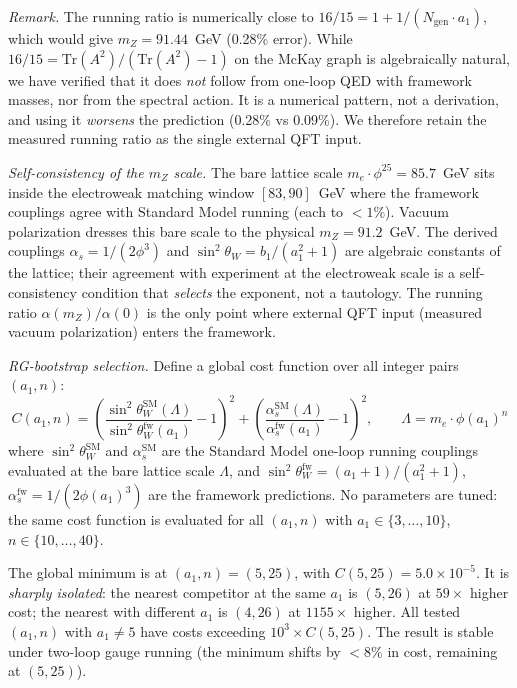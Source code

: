 \documentclass[12pt,a4paper]{article}
\theoremstyle{definition}
\begin{document}
\noindent\textit{Remark.}  The running ratio is numerically close to $16/15 = 1 + 1/(N_{\text{gen}} \cdot a_1)$, which would give $m_Z = 91.44$~GeV (0.28\% error).  While $16/15 = \mathrm{Tr}(A^2)/(\mathrm{Tr}(A^2)-1)$ on the McKay graph is algebraically natural, we have verified that it does \emph{not} follow from one-loop QED with framework masses, nor from the spectral action.  It is a numerical pattern, not a derivation, and using it \emph{worsens} the prediction (0.28\% vs 0.09\%).  We therefore retain the measured running ratio as the single external QFT input.

\noindent\textit{Self-consistency of the $m_Z$ scale.}  The bare lattice scale $m_e \cdot \phi^{25} = 85.7$~GeV sits inside the electroweak matching window $[83, 90]$~GeV where the framework couplings agree with Standard Model running (each to $< 1\%$).  Vacuum polarization dresses this bare scale to the physical $m_Z = 91.2$~GeV.  The derived couplings $\alpha_s = 1/(2\phi^3)$ and $\sin^2\theta_W = b_1/(a_1^2+1)$ are algebraic constants of the lattice; their agreement with experiment at the electroweak scale is a self-consistency condition that \emph{selects} the exponent, not a tautology.  The running ratio $\alpha(m_Z)/\alpha(0)$ is the only point where external QFT input (measured vacuum polarization) enters the framework.

\noindent\textit{RG-bootstrap selection.}  Define a global cost function over all integer pairs $(a_1, n)$:
\begin{equation}
C(a_1, n) = \left(\frac{\sin^2\theta_W^{\mathrm{SM}}(\Lambda)}{\sin^2\theta_W^{\mathrm{fw}}(a_1)} - 1\right)^2 + \left(\frac{\alpha_s^{\mathrm{SM}}(\Lambda)}{\alpha_s^{\mathrm{fw}}(a_1)} - 1\right)^2, \qquad \Lambda = m_e \cdot \phi(a_1)^n
\label{eq:rg_cost}
\end{equation}
where $\sin^2\theta_W^{\mathrm{SM}}$ and $\alpha_s^{\mathrm{SM}}$ are the Standard Model one-loop running couplings evaluated at the bare lattice scale $\Lambda$, and $\sin^2\theta_W^{\mathrm{fw}} = (a_1+1)/(a_1^2+1)$, $\alpha_s^{\mathrm{fw}} = 1/(2\phi(a_1)^3)$ are the framework predictions.  No parameters are tuned: the same cost function is evaluated for all $(a_1, n)$ with $a_1 \in \{3, \ldots, 10\}$, $n \in \{10, \ldots, 40\}$.

The global minimum is at $(a_1, n) = (5, 25)$, with $C(5,25) = 5.0 \times 10^{-5}$.  It is \emph{sharply isolated}: the nearest competitor at the same $a_1$ is $(5, 26)$ at $59\times$ higher cost; the nearest with different $a_1$ is $(4, 26)$ at $1155\times$ higher.  All tested $(a_1, n)$ with $a_1 \ne 5$ have costs exceeding $10^3 \times C(5,25)$.  The result is stable under two-loop gauge running (the minimum shifts by $< 8\%$ in cost, remaining at $(5,25)$).
\end{document}
